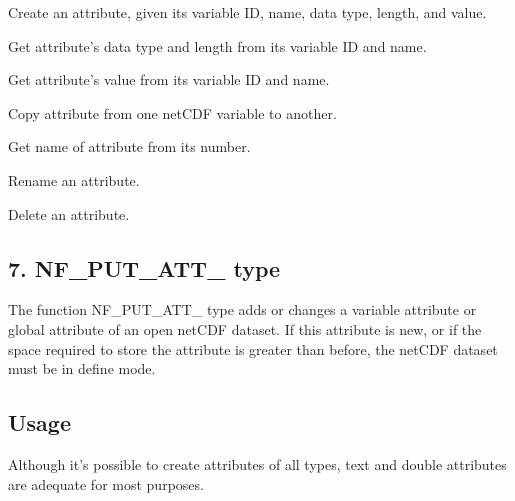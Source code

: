 \begin{DoxyItemize}
\item Create an attribute, given its variable ID, name, data type, length, and value.
\item Get attribute’s data type and length from its variable ID and name.
\item Get attribute’s value from its variable ID and name.
\item Copy attribute from one net\+C\+DF variable to another.
\item Get name of attribute from its number.
\item Rename an attribute.
\item Delete an attribute.
\end{DoxyItemize}

\subsection*{7. N\+F\+\_\+\+P\+U\+T\+\_\+\+A\+T\+T\+\_\+ type }

The function N\+F\+\_\+\+P\+U\+T\+\_\+\+A\+T\+T\+\_\+ type adds or changes a variable attribute or global attribute of an open net\+C\+DF dataset. If this attribute is new, or if the space required to store the attribute is greater than before, the net\+C\+DF dataset must be in define mode.

\subsection*{Usage }

Although it’s possible to create attributes of all types, text and double attributes are adequate for most purposes.

 


